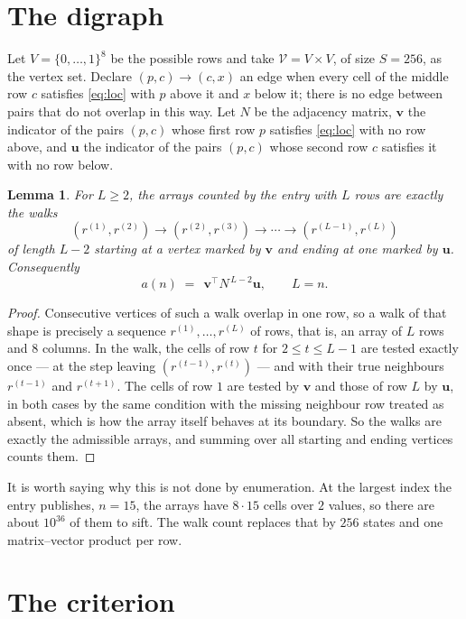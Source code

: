 \documentclass[11pt,a4paper]{article}
\theoremstyle{plain}
\newtheorem{lemma}[theorem]{Lemma}
\theoremstyle{definition}
\begin{document}
\section{The digraph}

Let $V=\{0,\dots,1\}^{8}$ be the possible rows and take
$\mathcal V=V\times V$, of size $S=256$, as the vertex set. Declare $(p,c)\to(c,x)$ an edge
when every cell of the middle row $c$ satisfies \eqref{eq:loc} with $p$ above it and $x$
below it; there is no edge between pairs that do not overlap in this way. Let $N$ be the
adjacency matrix, $\mathbf{v}$ the indicator of the pairs $(p,c)$ whose first row $p$
satisfies \eqref{eq:loc} with no row above, and $\mathbf{u}$ the indicator of
the pairs $(p,c)$ whose second row $c$ satisfies it with no row below.

\begin{lemma}\label{lem:walk}
For $L\ge2$, the arrays counted by the entry with $L$ rows are exactly the walks
\[
(r^{(1)},r^{(2)})\to(r^{(2)},r^{(3)})\to\cdots\to(r^{(L-1)},r^{(L)})
\]
of length $L-2$ starting at a vertex marked by $\mathbf{v}$ and ending at one marked by
$\mathbf{u}$. Consequently
\[
a(n)\;=\;\,\mathbf{v}^{\!\top}N^{\,L-2}\mathbf{u},\qquad L=n .
\]
\end{lemma}

\begin{proof}
Consecutive vertices of such a walk overlap in one row, so a walk of that shape is
precisely a sequence $r^{(1)},\dots,r^{(L)}$ of rows, that is, an array of $L$ rows
and $8$ columns. In the walk, the cells of row $t$ for $2\le t\le L-1$ are tested
exactly once --- at the step leaving $(r^{(t-1)},r^{(t)})$ --- and with their true
neighbours $r^{(t-1)}$ and $r^{(t+1)}$. The cells of row $1$ are tested by
$\mathbf{v}$ and those of row $L$ by $\mathbf{u}$, in both cases by the same condition
with the missing neighbour row treated as absent, which is how the array itself behaves at
its boundary. So the walks are exactly the admissible arrays, and summing over all starting
and ending vertices counts them.
\end{proof}


It is worth saying why this is not done by enumeration. At the largest index the entry
publishes, $n=15$, the arrays have $8\cdot15$ cells over
$2$ values, so there are about $10^{36}$ of them to sift. The
walk count replaces that by $256$ states and one matrix--vector product per row.
\section{The criterion}
\end{document}
